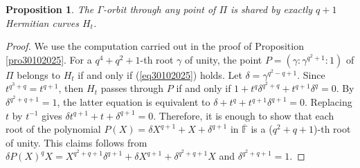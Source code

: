 \documentclass[10pt,a4paper]{amsart}
\newtheorem{prop}{Proposition}
\begin{document}
\begin{prop}
\label{pro02112025A} The $\Gamma$-orbit through any point of $\Pi$ is shared by exactly $q+1$ Hermitian curves $H_t$.  
\end{prop}

\begin{proof} We use the computation carried out in the proof of Proposition \ref{pro30102025}. 
For a $q^4+q^2+1$-th root $\gamma$ of unity, the point $P=(\gamma:\gamma^{q^2+1}:1)$ of $\Pi$ belongs to $H_t$ if and only
if (\ref{eq30102025}) holds. Let $\delta=\gamma^{q^2-q+1}$. Since $t^{q^3+q}=t^{q+1}$, then $H_t$ passes through $P$ if and only if $1+t^q\delta^{q^2+q}+t^{q+1}\delta^q=0$. By $\delta^{q^2+q+1}=1$, the latter equation is equivalent to  
$\delta+t^q+t^{q+1}\delta^{q+1}=0$. Replacing $t$ by $t^{-1}$ gives $\delta t^{q+1}+t+\delta^{q+1}=0$. Therefore, it is enough to show that each root of the polynomial $P(X)=\delta X^{q+1}+X+\delta^{q+1}$ in $\overline{\mathbb{F}}$ is a ($q^2+q+1$)-th root of unity. This claims follows from $\delta P(X)^qX=X^{q^2+q+1}\delta^{q+1}+\delta X^{q+1}+\delta^{q^2+q+1}X$ and $\delta^{q^2+q+1}=1$.       
\end{proof}
\end{document}
